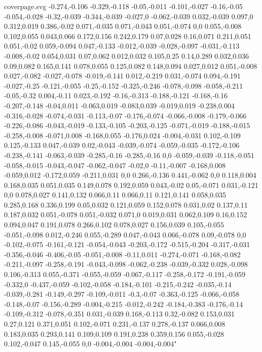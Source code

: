 \begin{filecontents}[noheader]{coverpage.svg}
-0.274,-0.106 -0.329,-0.118 -0.05,-0.011 -0.101,-0.027 -0.16,-0.05 -0.054,-0.028 -0.32,-0.039 -0.344,-0.039 -0.027,0 -0.062,-0.039 0.032,-0.039 0.097,0 0.312,0.019 0.386,-0.02 0.071,-0.035 0.071,-0.043 0.051,-0.074 0,0 0.055,-0.008 0.102,0.055 0.043,0.066 0.172,0.156 0.242,0.179 0.07,0.028 0.16,0.071 0.211,0.051 0.051,-0.02 0.059,-0.094 0.047,-0.133 -0.012,-0.039 -0.028,-0.097 -0.031,-0.113 -0.008,-0.02 0.054,0.031 0.07,0.062 0.012,0.032 0.105,0.25 0.14,0.289 0.032,0.036 0.09,0.082 0.165,0.141 0.078,0.055 0.125,0.082 0.148,0.094 0.027,0.012 0.051,-0.008 0.027,-0.082 -0.027,-0.078 -0.019,-0.141 0.012,-0.219 0.031,-0.074 0.094,-0.191 -0.027,-0.25 -0.121,-0.055 -0.25,-0.152 -0.325,-0.246 -0.078,-0.098 -0.058,-0.211 -0.05,-0.32 0.004,-0.11 0.023,-0.192 -0.16,-0.313 -0.188,-0.121 -0.168,-0.16 -0.207,-0.148 -0.04,0.011 -0.063,0.019 -0.083,0.039 -0.019,0.019 -0.238,0.004 -0.316,-0.028 -0.074,-0.031 -0.113,-0.07 -0.176,-0.074 -0.066,-0.008 -0.179,-0.066 -0.226,-0.086 -0.043,-0.019 -0.133,-0.105 -0.203,-0.125 -0.071,-0.019 -0.188,-0.015 -0.258,-0.008 -0.071,0.008 -0.168,0.055 -0.176,0.024 -0.004,-0.031 0.102,-0.109 0.125,-0.133 0.047,-0.039 0.02,-0.043 -0.039,-0.074 -0.059,-0.035 -0.172,-0.106 -0.238,-0.141 -0.063,-0.039 -0.285,-0.16 -0.285,-0.16 0,0 -0.059,-0.039 -0.118,-0.051 -0.058,-0.015 -0.043,-0.047 -0.062,-0.047 -0.02,0 -0.11,-0.007 -0.168,0.008 -0.059,0.012 -0.172,0.059 -0.211,0.031 0,0 0.266,-0.136 0.441,-0.062 0,0 0.118,0.004 0.168,0.035 0.051,0.035 0.149,0.078 0.192,0.059 0.043,-0.02 0.05,-0.071 0.031,-0.121 0,0 0.078,0.027 0.141,0.132 0.066,0.11 0.066,0.11 0.121,0.141 0.058,0.035 0.285,0.168 0.336,0.199 0.05,0.032 0.121,0.059 0.152,0.078 0.031,0.02 0.137,0.11 0.187,0.032 0.051,-0.078 0.051,-0.032 0.071,0 0.019,0.031 0.062,0.109 0.16,0.152 0.094,0.047 0.191,0.078 0.266,0.102 0.078,0.027 0.156,0.039 0.105,-0.055 -0.051,-0.098 0.012,-0.246 0.055,-0.289 0.047,-0.043 0.066,-0.078 0.09,-0.078 0,0 -0.102,-0.075 -0.161,-0.121 -0.054,-0.043 -0.203,-0.172 -0.515,-0.204 -0.317,-0.031 -0.356,-0.046 -0.406,-0.05 -0.051,-0.008 -0.11,0.011 -0.274,-0.071 -0.168,-0.082 -0.211,-0.097 -0.258,-0.191 -0.043,-0.098 -0.062,-0.238 -0.039,-0.332 0.028,-0.098 0.106,-0.313 0.055,-0.371 -0.055,-0.059 -0.067,-0.117 -0.258,-0.172 -0.191,-0.059 -0.332,0 -0.437,-0.059 -0.102,-0.058 -0.184,-0.101 -0.215,-0.242 -0.035,-0.14 -0.039,-0.281 -0.149,-0.297 -0.109,-0.011 -0.3,-0.07 -0.363,-0.125 -0.066,-0.058 -0.148,-0.07 -0.156,-0.289 -0.004,-0.215 -0.012,-0.242 -0.184,-0.383 -0.176,-0.14 -0.109,-0.312 -0.078,-0.351 0.031,-0.039 0.168,-0.113 0.32,-0.082 0.153,0.031 0.27,0.121 0.371,0.051 0.102,-0.071 0.231,-0.137 0.278,-0.137 0.066,0.008 0.183,0.035 0.293,0.141 0.109,0.109 0.191,0.238 0.359,0.156 0.055,-0.028 0.102,-0.047 0.145,-0.055 0,0 -0.004,-0.004 -0.004,-0.004"

\end{filecontents}
